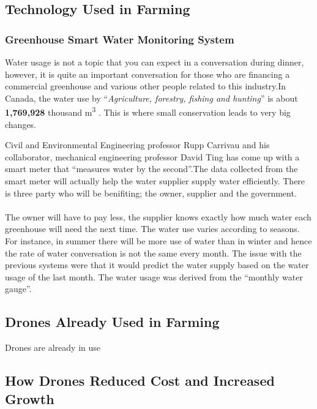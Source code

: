 \documentclass{article}
\begin{document}
\begin{multicols}{2}

\subsection{Technology Used in Farming}
\subsubsection{Greenhouse Smart Water Monitoring System}

Water usage is not a topic that you can expect in a conversation during dinner, however, it is quite an important conversation for those who are financing a commercial greenhouse and various other people related to this industry.In Canada, the water use by ``\textit{Agriculture, forestry, fishing and hunting}'' is about \textbf{1,769,928} thousand m\textsuperscript{3} \cite{greenhousewatering}. This is where small conservation leads to very big changes.

Civil and Environmental Engineering professor Rupp Carrivau and his collaborator, mechanical engineering professor David Ting has come up with a smart meter that ``measures water by the second''.The data collected from the smart meter will actually help the water supplier supply water efficiently. There is three party who will be benifiting; the owner, supplier and the government.

\paragraph{} 
The owner will have to pay less, the supplier knows exactly how much water each greenhouse will need the next time. The water use varies according to seasons. For instance, in summer there will be more use of water than in winter and hence the rate of water conversation is not the same every month. The issue with the previous systems were that it would predict the water supply based on the water usage of the last month. The water usage was derived from the ``monthly water gauge''.



\subsection{Drones Already Used in Farming}
Drones are already in use


\subsection{How Drones Reduced Cost and Increased Growth}
\end{multicols}
\end{document}
